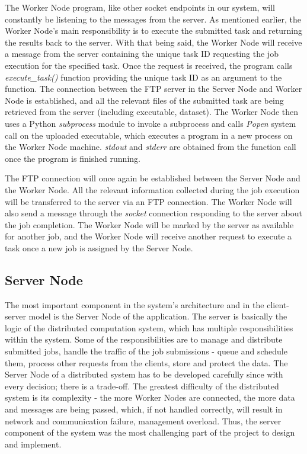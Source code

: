 \documentclass[10pt]{report}
\begin{document}
The Worker Node program, like other socket endpoints in our system, will constantly be listening to the messages from the server. As mentioned earlier, the Worker Node's main responsibility is to execute the submitted task and returning the results back to the server. With that being said, the Worker Node will receive a message from the server containing the unique task ID requesting the job execution for the specified task. Once the request is received, the program calls \textit{execute\_task()} function providing the unique task ID as an argument to the function. The connection between the FTP server in the Server Node and Worker Node is established, and all the relevant files of the submitted task are being retrieved from the server (including executable, dataset). The Worker Node then uses a Python \textit{subprocess} module to invoke a subprocess and calls \textit{Popen} system call on the uploaded executable, which executes a program in a new process on the Worker Node machine. \textit{stdout} and \textit{stderr} are obtained from the function call once the program is finished running.
\newline

The FTP connection will once again be established between the Server Node and the Worker Node. All the relevant information collected during the job execution will be transferred to the server via an FTP connection. The Worker Node will also send a message through the \textit{socket} connection responding to the server about the job completion. The Worker Node will be marked by the server as available for another job, and the Worker Node will receive another request to execute a task once a new job is assigned by the Server Node.

\subsection{Server Node}

The most important component in the system's architecture and in the client-server model is the Server Node of the application. The server is basically the logic of the distributed computation system, which has multiple responsibilities within the system. Some of the responsibilities are to manage and distribute submitted jobs, handle the traffic of the job submissions - queue and schedule them, process other requests from the clients, store and protect the data. The Server Node of a distributed system has to be developed carefully since with every decision; there is a trade-off. The greatest difficulty of the distributed system is its complexity - the more Worker Nodes are connected, the more data and messages are being passed, which, if not handled correctly, will result in network and communication failure, management overload. Thus, the server component of the system was the most challenging part of the project to design and implement.
\end{document}

